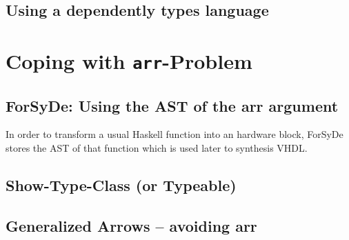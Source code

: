 \documentclass[9pt,final,a4paper,leqno]{article}
\newcommand{\hs}[1]{\mbox{\lstinline[basicstyle=\color{textgray}]!#1!}}
\begin{document}
\subsection{Using a dependently types language}

\section{Coping with \hs{arr}-Problem}

\subsection{ForSyDe: Using the AST of the arr argument}

In order to transform a usual Haskell function into an hardware block, ForSyDe stores the AST of that function which is
used later to synthesis VHDL.

\subsection{Show-Type-Class (or Typeable)}

\subsection{Generalized Arrows -- avoiding arr}




\end{document}
